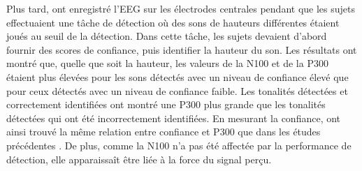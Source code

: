 Plus tard, \cite{parasuraman1980brain} ont enregistré l'EEG sur les électrodes centrales pendant que les sujets effectuaient une tâche de détection où des sons de hauteurs différentes étaient joués au seuil de la détection. 
Dans cette tâche, les sujets devaient d'abord fournir des scores de confiance, puis identifier la hauteur du son. 
Les résultats ont montré que, quelle que soit la hauteur, les valeurs de la N100 et de la P300 étaient plus élevées pour les sons détectés avec un niveau de confiance élevé que pour ceux détectés avec un niveau de confiance faible. 
Les tonalités détectées et correctement identifiées ont montré une P300 plus grande que les tonalités détectées qui ont été incorrectement identifiées. 
En mesurant la confiance, \cite{parasuraman1980brain} ont ainsi trouvé la même relation entre confiance et P300 que dans les études précédentes \citep{paul1972evoked, squires1973vertex}. 
De plus, comme la N100 n'a pas été affectée par la performance de détection, elle apparaissaît être liée à la force du signal perçu. 


